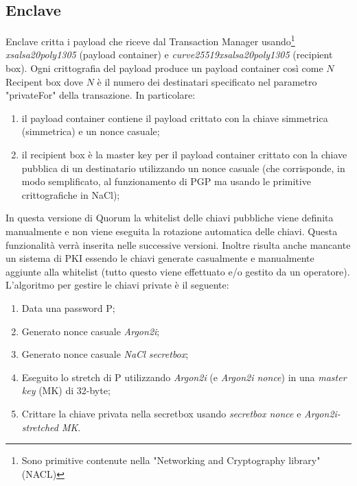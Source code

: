 \subsection{Enclave}%
Enclave critta i payload che riceve dal Transaction Manager usando\footnote{Sono primitive contenute nella "Networking and Cryptography library" (NACL)} \emph{xsalsa20poly1305}\cite{nacl} (payload container) e  \emph{curve25519xsalsa20poly1305}\cite{nacl} (recipient box). Ogni crittografia del payload produce un payload container così come $N$ Recipent box dove $N$ è il numero dei destinatari specificato nel parametro "privateFor" della transazione. In particolare:
\begin{enumerate}
	\item il payload container contiene il payload crittato con la chiave simmetrica (\gls{simmetrica}) e un nonce casuale;
	\item il recipient box è la master key per il payload container crittato con la chiave pubblica di un destinatario utilizzando un nonce casuale (che corrisponde, in modo semplificato, al funzionamento di PGP ma usando le primitive crittografiche in NaCl);
\end{enumerate}
In questa versione di Quorum la whitelist delle chiavi pubbliche viene definita manualmente e non viene eseguita la rotazione automatica delle chiavi. Questa funzionalità verrà inserita nelle successive versioni. Inoltre risulta anche mancante un sistema di PKI essendo le chiavi generate casualmente e manualmente aggiunte alla whitelist (tutto questo viene effettuato e/o gestito da un operatore). \\
L'algoritmo per gestire le chiavi private è il seguente:
\begin{enumerate}
	\item Data una password P;
	\item Generato nonce casuale \emph{Argon2i};
	\item Generato nonce casuale \emph{NaCl secretbox};
	\item Eseguito lo stretch di P utilizzando \emph{Argon2i} (e \emph{Argon2i nonce}) in una \emph{master key} (MK) di 32-byte;
	\item Crittare la chiave privata nella secretbox usando \emph{secretbox nonce} e \emph{Argon2i-stretched MK}.
\end{enumerate}